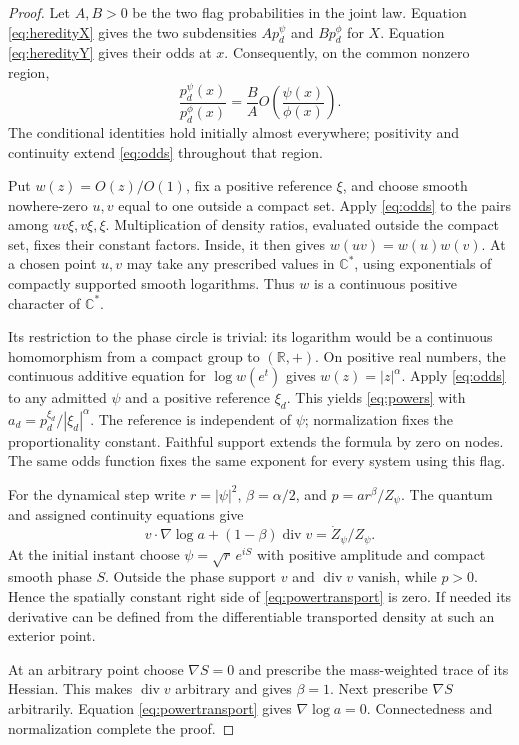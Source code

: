 \documentclass[11pt]{article}
\numberwithin{equation}{section}
\theoremstyle{definition}
\newcommand{\R}{\mathbb R}
\newcommand{\C}{\mathbb C}
\newcommand{\diver}{\operatorname{div}}
\begin{document}
\begin{proof}
Let \(A,B>0\) be the two flag probabilities in the joint law. Equation \eqref{eq:heredityX} gives the two subdensities \(A p_d^\psi\) and \(B p_d^\phi\) for \(X\). Equation \eqref{eq:heredityY} gives their odds at \(x\). Consequently, on the common nonzero region,
\begin{equation}\label{eq:odds}
 \frac{p_d^\psi(x)}{p_d^\phi(x)}
       =\frac BA O\!\left(\frac{\psi(x)}{\phi(x)}\right).
\end{equation}
The conditional identities hold initially almost everywhere; positivity and continuity extend \eqref{eq:odds} throughout that region.

Put \(w(z)=O(z)/O(1)\), fix a positive reference \(\xi\), and choose smooth nowhere-zero \(u,v\) equal to one outside a compact set. Apply \eqref{eq:odds} to the pairs among \(uv\xi,v\xi,\xi\). Multiplication of density ratios, evaluated outside the compact set, fixes their constant factors. Inside, it then gives \(w(uv)=w(u)w(v)\). At a chosen point \(u,v\) may take any prescribed values in \(\C^*\), using exponentials of compactly supported smooth logarithms. Thus \(w\) is a continuous positive character of \(\C^*\).

Its restriction to the phase circle is trivial: its logarithm would be a continuous homomorphism from a compact group to \((\R,+)\). On positive real numbers, the continuous additive equation for \(\log w(e^t)\) gives \(w(z)=|z|^\alpha\). Apply \eqref{eq:odds} to any admitted \(\psi\) and a positive reference \(\xi_d\). This yields \eqref{eq:powers} with
\(a_d=p_d^{\xi_d}/|\xi_d|^\alpha\). The reference is independent of \(\psi\); normalization fixes the proportionality constant. Faithful support extends the formula by zero on nodes. The same odds function fixes the same exponent for every system using this flag.

For the dynamical step write \(r=|\psi|^2\), \(\beta=\alpha/2\), and
\(p=ar^\beta/Z_\psi\). The quantum and assigned continuity equations give
\begin{equation}\label{eq:powertransport}
 v\cdot\nabla\log a+(1-\beta)\diver v=\dot Z_\psi/Z_\psi .
\end{equation}
At the initial instant choose \(\psi=\sqrt r\,e^{iS}\) with positive amplitude and compact smooth phase \(S\). Outside the phase support \(v\) and \(\diver v\) vanish, while \(p>0\). Hence the spatially constant right side of \eqref{eq:powertransport} is zero. If needed its derivative can be defined from the differentiable transported density at such an exterior point.

At an arbitrary point choose \(\nabla S=0\) and prescribe the mass-weighted trace of its Hessian. This makes \(\diver v\) arbitrary and gives \(\beta=1\). Next prescribe \(\nabla S\) arbitrarily. Equation \eqref{eq:powertransport} gives \(\nabla\log a=0\). Connectedness and normalization complete the proof.
\end{proof}
\end{document}
